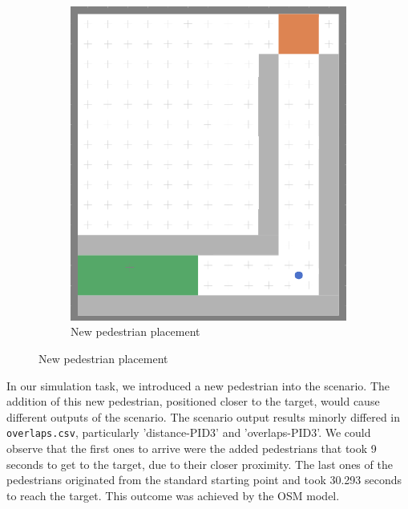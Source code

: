 \begin{figure}[H]
\begin{subfigure}[b]{0.4\textwidth}
     \includegraphics[width=\textwidth]{images/task3(done).png}
     \caption{New pedestrian placement}
     \label{fig: 3b}
 \end{subfigure}
 \end{figure}


In our simulation task, we introduced a new pedestrian into the scenario. The addition of this new pedestrian, positioned closer to the target, would cause different outputs of the scenario. The scenario output results minorly differed in \texttt{overlaps.csv}, particularly 'distance-PID3' and 'overlaps-PID3'. We could observe that the first ones to arrive were the added pedestrians that took 9 seconds to get to the target, due to their closer proximity. The last ones of the pedestrians originated from the standard starting point and took 30.293 seconds to reach the target. This outcome was achieved by the OSM model.